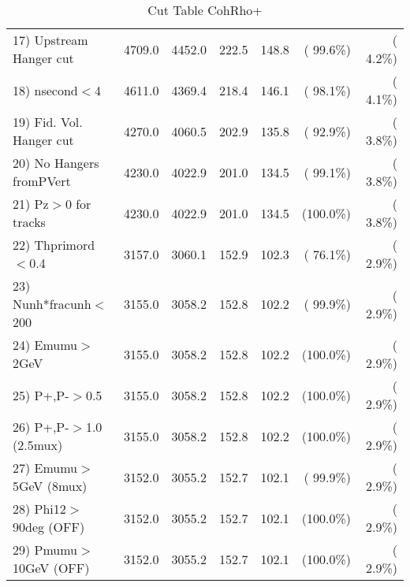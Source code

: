 \begin{table}[h!]
\begin{tabular}{||l||r|r|r|r|r|r||}
 17) Upstream Hanger cut  &       4709.0 &       4452.0 &        222.5 &        148.8 & ( 99.6\%) & (  4.2\%) \\
 18) nsecond$<$4          &       4611.0 &       4369.4 &        218.4 &        146.1 & ( 98.1\%) & (  4.1\%) \\
 19) Fid. Vol. Hanger cut &       4270.0 &       4060.5 &        202.9 &        135.8 & ( 92.9\%) & (  3.8\%) \\
 20) No Hangers fromPVert &       4230.0 &       4022.9 &        201.0 &        134.5 & ( 99.1\%) & (  3.8\%) \\
 21) Pz$>$0 for tracks    &       4230.0 &       4022.9 &        201.0 &        134.5 & (100.0\%) & (  3.8\%) \\
 22) Thprimord$<$0.4      &       3157.0 &       3060.1 &        152.9 &        102.3 & ( 76.1\%) & (  2.9\%) \\
 23) Nunh*fracunh$<$200   &       3155.0 &       3058.2 &        152.8 &        102.2 & ( 99.9\%) & (  2.9\%) \\
 24) Emumu$>$2GeV         &       3155.0 &       3058.2 &        152.8 &        102.2 & (100.0\%) & (  2.9\%) \\
 25) P+,P-$>$0.5          &       3155.0 &       3058.2 &        152.8 &        102.2 & (100.0\%) & (  2.9\%) \\
 26) P+,P-$>$1.0 (2.5mux) &       3155.0 &       3058.2 &        152.8 &        102.2 & (100.0\%) & (  2.9\%) \\
 27) Emumu$>$5GeV  (8mux) &       3152.0 &       3055.2 &        152.7 &        102.1 & ( 99.9\%) & (  2.9\%) \\
 28) Phi12$>$90deg  (OFF) &       3152.0 &       3055.2 &        152.7 &        102.1 & (100.0\%) & (  2.9\%) \\
 29) Pmumu$>$10GeV  (OFF) &       3152.0 &       3055.2 &        152.7 &        102.1 & (100.0\%) & (  2.9\%) \\
 \hline
 \hline
 \end{tabular}
 \caption{Cut Table  CohRho+  }
 \label{tab-cutcohjpsi-mumu_cohrhop}
 \end{table}
